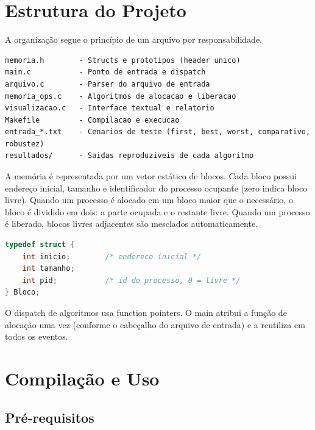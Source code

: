 \documentclass[12pt]{article}
\begin{document}
\section{Estrutura do Projeto}

A organização segue o princípio de um arquivo por responsabilidade.

\begin{lstlisting}
memoria.h        - Structs e prototipos (header unico)
main.c           - Ponto de entrada e dispatch
arquivo.c        - Parser do arquivo de entrada
memoria_ops.c    - Algoritmos de alocacao e liberacao
visualizacao.c   - Interface textual e relatorio
Makefile         - Compilacao e execucao
entrada_*.txt    - Cenarios de teste (first, best, worst, comparativo, robustez)
resultados/      - Saidas reproduziveis de cada algoritmo
\end{lstlisting}

A memória é representada por um vetor estático de blocos. Cada bloco possui endereço inicial, tamanho e identificador do processo ocupante (zero indica bloco livre). Quando um processo é alocado em um bloco maior que o necessário, o bloco é dividido em dois: a parte ocupada e o restante livre. Quando um processo é liberado, blocos livres adjacentes são mesclados automaticamente.

\begin{lstlisting}[language=C]
typedef struct {
    int inicio;        /* endereco inicial */
    int tamanho;
    int pid;           /* id do processo, 0 = livre */
} Bloco;
\end{lstlisting}

O dispatch de algoritmos usa function pointers. O main atribui a função de alocação uma vez (conforme o cabeçalho do arquivo de entrada) e a reutiliza em todos os eventos.

\section{Compilação e Uso}

\subsection{Pré-requisitos}
\end{document}
